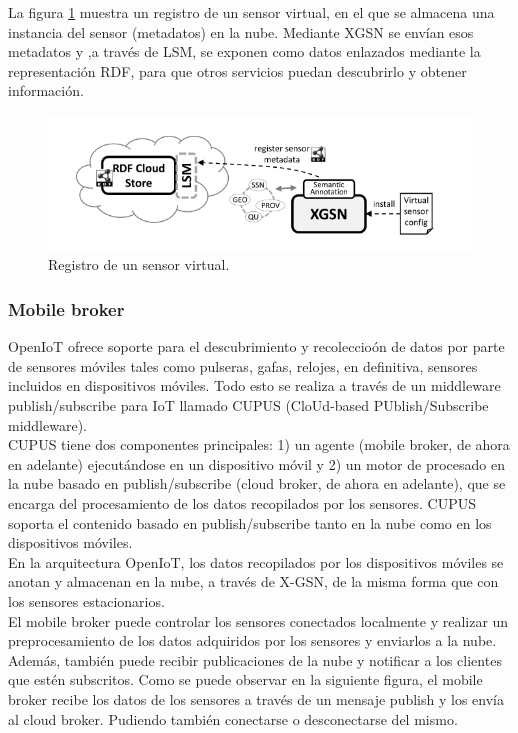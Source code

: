 \documentclass[12pt, twoside]{book}
\begin{document}
La figura \ref{L305} muestra un registro de un sensor virtual, en el que se almacena una instancia del sensor (metadatos) en la nube.  
Mediante XGSN se envían esos metadatos y ,a través de LSM, se exponen como datos enlazados mediante la representación RDF, para que otros servicios puedan descubrirlo y obtener información.
\begin{figure}[H]
\centering
\includegraphics[scale=0.6]{images/registration_sensor_xgsm}
\caption{Registro de un sensor virtual.}\label{L305}
\end{figure}
\subsubsection{Mobile broker}
OpenIoT ofrece soporte para el descubrimiento y recoleccioón de datos por parte de sensores móviles tales como pulseras, gafas, relojes, en definitiva, sensores incluidos en dispositivos móviles. Todo esto se realiza a través de un middleware publish/subscribe para IoT llamado CUPUS (CloUd-based PUblish/Subscribe middleware). \\
CUPUS tiene dos componentes principales: 1) un agente (mobile broker, de ahora en adelante) ejecutándose en un dispositivo móvil y 2) un motor de procesado en la nube basado en publish/subscribe (cloud broker, de ahora en adelante), que se encarga del procesamiento de los datos recopilados por los sensores. CUPUS soporta el contenido basado en publish/subscribe tanto en la nube como en los dispositivos móviles.\\
En la arquitectura OpenIoT, los datos recopilados por los dispositivos móviles se anotan y almacenan en la nube, a través de X-GSN, de la misma forma que con los sensores estacionarios. \\

El mobile broker puede controlar los sensores conectados localmente y realizar un preprocesamiento de los datos adquiridos por los sensores y enviarlos a la nube. Además, también puede recibir publicaciones de la nube y notificar a los clientes que estén subscritos. Como se puede observar en la siguiente figura, el mobile broker recibe los datos de los sensores a través de un mensaje publish y los envía al cloud broker. Pudiendo también conectarse o desconectarse del mismo.\\
\end{document}
